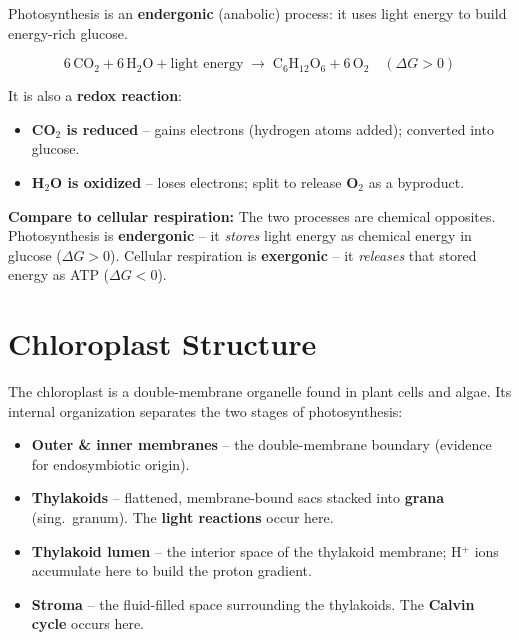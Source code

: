\documentclass[11pt, letterpaper]{article}
\begin{document}
Photosynthesis is an \textbf{endergonic} (anabolic) process: it uses light energy to build energy-rich glucose.

\[
  6\,\text{CO}_2 + 6\,\text{H}_2\text{O} + \text{light energy} \;\longrightarrow\; \text{C}_6\text{H}_{12}\text{O}_6 + 6\,\text{O}_2 \quad (\Delta G > 0)
\]

It is also a \textbf{redox reaction}:
\begin{itemize}[noitemsep]
  \item \textbf{CO$_2$ is reduced} -- gains electrons (hydrogen atoms added); converted into glucose.
  \item \textbf{H$_2$O is oxidized} -- loses electrons; split to release \textbf{O$_2$} as a byproduct.
\end{itemize}

\begin{tcolorbox}[colback=part2bg, colframe=sectiongreen, arc=3pt, boxrule=1pt]
\textbf{Compare to cellular respiration:} The two processes are chemical opposites.
Photosynthesis is \textbf{endergonic} -- it \emph{stores} light energy as chemical energy in glucose ($\Delta G > 0$).
Cellular respiration is \textbf{exergonic} -- it \emph{releases} that stored energy as ATP ($\Delta G < 0$).
\end{tcolorbox}

\section*{Chloroplast Structure}

The chloroplast is a double-membrane organelle found in plant cells and algae. Its internal organization separates the two stages of photosynthesis:

\begin{itemize}[noitemsep]
  \item \textbf{Outer \& inner membranes} -- the double-membrane boundary (evidence for endosymbiotic origin).
  \item \textbf{Thylakoids} -- flattened, membrane-bound sacs stacked into \textbf{grana} (sing.\ granum). The \textbf{light reactions} occur here.
  \item \textbf{Thylakoid lumen} -- the interior space of the thylakoid membrane; H$^+$ ions accumulate here to build the proton gradient.
  \item \textbf{Stroma} -- the fluid-filled space surrounding the thylakoids. The \textbf{Calvin cycle} occurs here.
\end{itemize}
\end{document}
